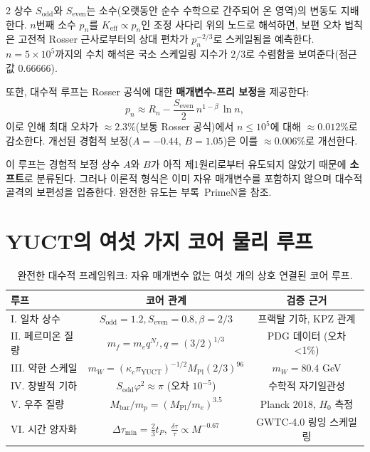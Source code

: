 \documentclass[12pt,a4paper]{article}
\begin{document}
\begin{multicols}{2}
		상수 \(S_{\mathrm{odd}}\)와 \(S_{\mathrm{even}}\)는 소수(오랫동안 순수 수학으로 간주되어 온 영역)의 변동도 지배한다. \(n\)번째 소수 \(p_n\)를 \(K_{\mathrm{eff}} \propto p_n\)인 조정 사다리 위의 노드로 해석하면, 보편 오차 법칙은 고전적 Rosser 근사로부터의 상대 편차가 \(p_n^{-2/3}\)로 스케일됨을 예측한다. \(n = 5\times10^5\)까지의 수치 해석은 국소 스케일링 지수가 \(2/3\)로 수렴함을 보여준다(점근값 \(0.66666\)).
		
		또한, 대수적 루프는 Rosser 공식에 대한 \textbf{매개변수-프리 보정}을 제공한다:
		\[
		p_n \approx R_n - \frac{S_{\mathrm{even}}}{2}\, n^{1-\beta}\,\ln n,
		\]
		이로 인해 최대 오차가 \(\approx 2.3\%\)(보통 Rosser 공식)에서 \(n\le 10^5\)에 대해 \(\approx 0.012\%\)로 감소한다. 개선된 경험적 보정(\(A = -0.44\), \(B = 1.05\))은 이를 \(\approx 0.006\%\)로 개선한다.
		
		이 루프는 경험적 보정 상수 \(A\)와 \(B\)가 아직 제1원리로부터 유도되지 않았기 때문에 \textbf{소프트}로 분류된다. 그러나 이론적 형식은 이미 자유 매개변수를 포함하지 않으며 대수적 골격의 보편성을 입증한다. 완전한 유도는 부록~PrimeN을 참조.
		
	\end{multicols}
	
	\section*{YUCT의 여섯 가지 코어 물리 루프}
	
	\begin{table}[htbp]
		\centering
		\caption{완전한 대수적 프레임워크: 자유 매개변수 없는 여섯 개의 상호 연결된 코어 루프.}
		\label{tab:all-loops}
		\footnotesize
		\begin{tabular}{l c c}
			\toprule
			\textbf{루프} & \textbf{코어 관계} & \textbf{검증 근거} \\
			\midrule
			I. 일차 상수 & \(S_{\mathrm{odd}}=1.2, S_{\mathrm{even}}=0.8, \beta=2/3\) & 프랙탈 기하, KPZ 관계 \\
			II. 페르미온 질량 & \(m_f = m_e q^{N_f}, q=(3/2)^{1/3}\) & PDG 데이터 (오차 <1\%) \\
			III. 약한 스케일 & \(m_W = (\kappa_c \pi_{\mathrm{YUCT}})^{-1/2} M_{\mathrm{Pl}} (2/3)^{96}\) & \(m_W = 80.4\) GeV \\
			IV. 창발적 기하 & \(S_{\mathrm{odd}}\varphi^2 \approx \pi\) (오차 \(10^{-5}\)) & 수학적 자기일관성 \\
			V. 우주 질량 & \(M_{\mathrm{bar}}/m_p = (M_{\mathrm{Pl}}/m_e)^{3.5}\) & Planck 2018, \(H_0\) 측정 \\
			VI. 시간 양자화 & \(\Delta \tau_{\min} = \frac{2}{3} t_P, \ \frac{\delta \tau}{\tau} \propto M^{-0.67}\) & GWTC-4.0 링잉 스케일링 \\
			\bottomrule
		\end{tabular}
	\end{table}
	
\end{document}
